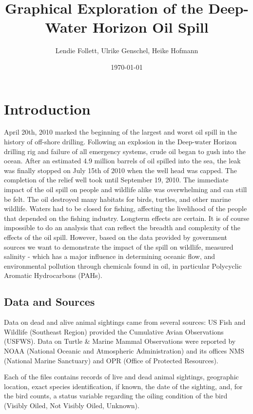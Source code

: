 \documentclass[11pt]{article}
\title{Graphical Exploration of the Deep-Water Horizon Oil Spill}
\author{Lendie Follett, Ulrike Genschel, Heike Hofmann}
\date{\today}                                           %
\begin{document}
\maketitle
\begin{abstract}
\end{abstract}
\section{Introduction}
April 20th, 2010 marked the beginning of the largest and worst oil spill in the history of off-shore drilling.  Following an explosion in the Deep-water Horizon drilling rig and failure of all emergency systems, crude oil began to gush into the ocean.  After an estimated 4.9 million barrels of oil spilled into the sea, the leak was finally stopped on July 15th of 2010 when the well head was capped.  The completion of the relief well took until September 19, 2010.  The immediate impact of the oil spill on people and wildlife alike was overwhelming and can still be felt.  The oil destroyed many habitats for birds, turtles, and other marine wildlife.  Waters had to be closed for fishing, affecting the livelihood of the people that depended on the fishing industry.  Longterm effects are certain.  It is of course impossible to do an analysis that can reflect the breadth and complexity of the effects of the oil spill.  However, based on the data provided by government sources we want to demonstrate the impact of the spill on wildlife, measured salinity - which has a major influence in determining oceanic flow, and environmental pollution through chemicals found in oil, in particular Polycyclic Aromatic Hydrocarbons (PAHs). 

\subsection{Data and Sources}
Data on dead and alive animal sightings came from several sources: US Fish and Wildlife (Southeast Region) provided the Cumulative Avian Observations (USFWS).
Data on Turtle \& Marine Mammal Observations were reported by NOAA (National Oceanic and Atmospheric Administration) and its offices NMS (National Marine Sanctuary) and OPR (Office of Protected Resources). 

Each of the files contains records of live and dead animal sightings, geographic location, exact species identification, if known, the date of the sighting, and, for the bird counts, a status variable regarding the oiling condition of the bird (Visibly Oiled, Not Visibly Oiled, Unknown). 
\end{document}
